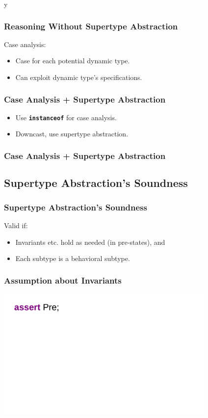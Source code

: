 \if y\MAKEHANDOUTS \documentclass[t,compress,landscape,handout]{beamer}
\begin{document}
\begin{frame}
\frametitle{Reasoning Without Supertype Abstraction}

Case analysis:
\begin{itemize}
\item
Case for each potential dynamic type.

\item
Can exploit dynamic type's specifications.
\end{itemize}
\end{frame}

\begin{frame}
\frametitle{Case Analysis + Supertype Abstraction}
\begin{itemize}
\item
Use \textbf{\texttt{instanceof}} for case analysis.

\item
Downcast, use supertype abstraction.
\end{itemize}
\end{frame}

\begin{frame}[fragile]
\frametitle{Case Analysis + Supertype Abstraction}

\end{frame}

\subsection[Validity]{Supertype Abstraction's Soundness}

\begin{frame}
\frametitle{Supertype Abstraction's Soundness}
Valid if:
\begin{itemize}
\item
Invariants etc. hold as needed (in pre-states), and

\item
Each subtype is a behavioral subtype.
\end{itemize}
\end{frame}

\begin{frame}
\frametitle{Assumption about Invariants}
\includegraphics[width=4.25in]{invariant-call1}
\end{frame}
\end{document}
